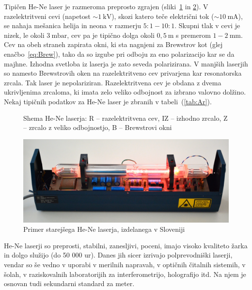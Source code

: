 Tipičen He-Ne laser je razmeroma preprosto zgrajen (sliki~\ref{fig:HeNeShema}
in \ref{fig:Iskra}).
V razelektritveni cevi (napetost  $\sim 1~\si{\kilo\volt}$), skozi
katero teče električni tok ($\sim 10~\si{\milli\ampere}$), 
se nahaja mešanica helija in neona v razmerju 
$5:1 - 10:1$. Skupni tlak v cevi je nizek, le okoli $3~\si{\milli\bar}$, 
cev pa je tipično dolga okoli $0,5~\si{\metre}$ s premerom $1-2~\si{\milli\metre}$.  
Cev na obeh straneh zapirata okni, ki sta nagnjeni za Brewstrov kot (glej enačbo~\ref{eq:Brew}), 
tako da so izgube pri odboju za eno polarizacijo kar se da majhne.
Izhodna svetloba iz laserja je zato seveda polarizirana. V manjših laserjih
so namesto Brewstrovih oken na razelektritveno cev privarjena kar
resonatorska zrcala. Tak laser je nepolariziran. 
Razelektritvena cev je obdana z dvema ukrivljenima zrcaloma, 
ki imata zelo veliko odbojnost za izbrano valovno dolžino.
Nekaj tipičnih podatkov za He-Ne laser je zbranih v tabeli~(\ref{tab:Ar}).
\begin{figure}[h]
\centering
\def\svgwidth{100truemm} 

\caption{Shema He-Ne laserja: R -- razelektritvena cev, IZ -- izhodno zrcalo, Z -- zrcalo
z veliko odbojnostjo, B -- Brewstrovi okni}
\label{fig:HeNeShema}
\end{figure}

\begin{figure}[h]
\centering
\includegraphics[width=120truemm]{slike/07_HeNe.jpg}
\caption{Primer starejšega He-Ne laserja, izdelanega v Sloveniji}
\label{fig:Iskra}
\end{figure}

He-Ne laserji so preprosti, stabilni, zanesljivi, poceni, imajo visoko kvaliteto žarka
in dolgo služijo (do 50 000 ur).
Danes jih sicer izrivajo polprevodniški laserji, vendar so še vedno v uporabi
v merilnih napravah, v optičnih čitalnih sistemih, v šolah, v raziskovalnih 
laboratorijih za interferometrijo, holografijo itd. Na njem je osnovan tudi 
sekundarni standard za meter.

